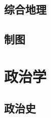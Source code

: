 \documentclass[UTF8]{RepresentationUniverse}
\begin{document}


\section{综合地理}
\section{制图}


\chapter{政治学}
\section{政治史}
\end{document}
